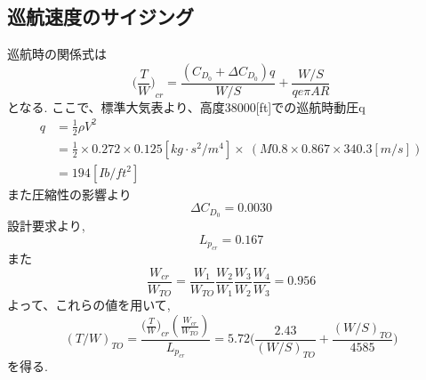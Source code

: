 \documentclass[../main]{subfiles}
\begin{document}
  \subsection{巡航速度のサイジング}
    巡航時の関係式は
    \begin{equation}
      {\biggl( \frac{T}{W} \biggr) }_{cr} = \frac{(C_{D_0}+ \Delta C_{D_0})q}{W/S} + \frac{W/S}{qe \pi AR}
    \end{equation}
    となる.
    ここで、標準大気表より、高度38000[ft]での巡航時動圧q
    \begin{align}
      q &= \frac{1}{2} \rho V^2 \\
        &= \frac{1}{2} \times 0.272 \times 0.125 [kg \cdot s^2/m^4] \times \
        (M 0.8 \times 0.867 \times 340.3[m/s]) \\
        &= 194[Ib/ft^2]
    \end{align}
    また圧縮性の影響より
    \begin{equation}
      \Delta C_{D_0} = 0.0030
    \end{equation}
    設計要求より,
    \begin{equation}
      L_{p_{cr}} = 0.167
    \end{equation}
    また
    \begin{equation}
      \frac{W_{cr}}{W_{TO}} = \frac{W_1}{W_{TO}}\frac{W_2}{W_1}\frac{W_3}{W_2}\frac{W_4}{W_3}
      = 0.956
    \end{equation}
    よって、これらの値を用いて,
    \begin{equation}
      {(T/W)}_{TO} = \dfrac{({\frac{T}{W})}_{cr} (\frac{W_{cr}}{W_{TO}})}{L_{p_{cr}}}
      = 5.72 \biggl ( \frac{2.43}{{(W/S)}_{TO}} + \frac{{(W/S)}_{TO}}{4585} \biggr)
    \end{equation}
    を得る.
\end{document}
